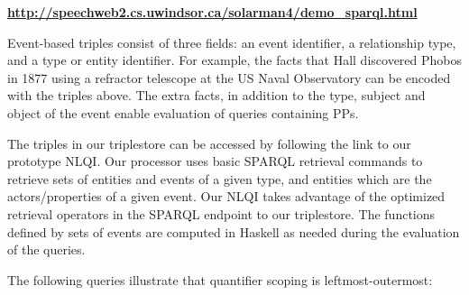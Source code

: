 \documentclass[../main.tex]{subfiles}
\begin{document}
\begin{refsection}

\begin{center}
	\textbf{\url{http://speechweb2.cs.uwindsor.ca/solarman4/demo_sparql.html}}
\end{center}


Event-based triples consist of three fields: an event identifier, a relationship type, and a type or
entity identifier. For example, the facts that Hall discovered Phobos in 1877 using a refractor
telescope at the US Naval Observatory can be encoded with the triples above.
The extra facts, in addition to the type, subject and object of the event enable evaluation of queries containing PPs.

The triples in our triplestore can be accessed by following the link to our prototype NLQI.
Our processor uses basic SPARQL retrieval commands to retrieve sets of entities and events of a given
type, and entities which are the actors/properties of a given event. Our NLQI takes
advantage of the optimized retrieval operators in the SPARQL endpoint to our triplestore. The
functions defined by sets of events are computed in Haskell as needed during the evaluation of the
queries.

The following queries illustrate that quantifier scoping is leftmost-outermost:

\examplespacing







\end{refsection}
\end{document}
